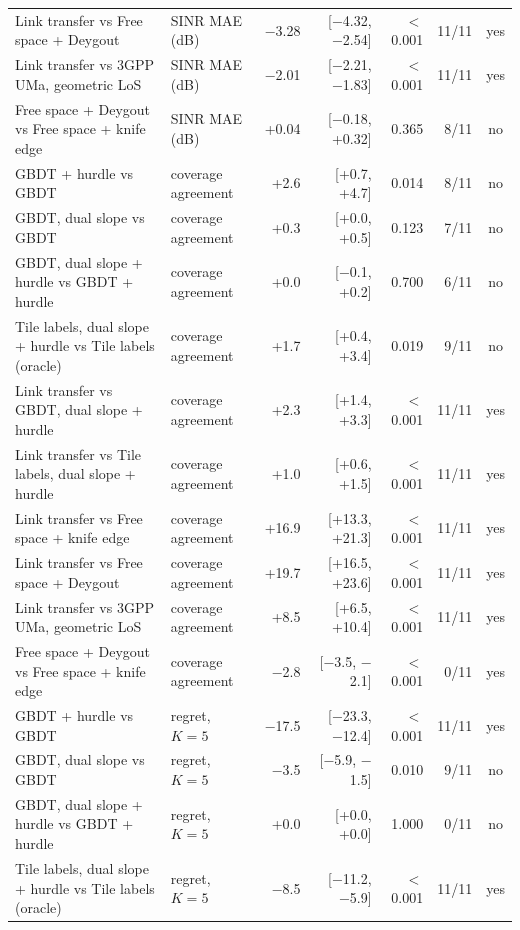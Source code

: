 \begin{tabular}{llrrrrc}
Link transfer vs Free space + Deygout & SINR MAE (dB) & \ensuremath{-}3.28 & [\ensuremath{-}4.32, \ensuremath{-}2.54] & $<$0.001 & 11/11 & yes \\
Link transfer vs 3GPP UMa, geometric LoS & SINR MAE (dB) & \ensuremath{-}2.01 & [\ensuremath{-}2.21, \ensuremath{-}1.83] & $<$0.001 & 11/11 & yes \\
Free space + Deygout vs Free space + knife edge & SINR MAE (dB) & +0.04 & [\ensuremath{-}0.18, +0.32] & 0.365 & 8/11 & no \\
GBDT + hurdle vs GBDT & coverage agreement & +2.6 & [+0.7, +4.7] & 0.014 & 8/11 & no \\
GBDT, dual slope vs GBDT & coverage agreement & +0.3 & [+0.0, +0.5] & 0.123 & 7/11 & no \\
GBDT, dual slope + hurdle vs GBDT + hurdle & coverage agreement & +0.0 & [\ensuremath{-}0.1, +0.2] & 0.700 & 6/11 & no \\
Tile labels, dual slope + hurdle vs Tile labels (oracle) & coverage agreement & +1.7 & [+0.4, +3.4] & 0.019 & 9/11 & no \\
Link transfer vs GBDT, dual slope + hurdle & coverage agreement & +2.3 & [+1.4, +3.3] & $<$0.001 & 11/11 & yes \\
Link transfer vs Tile labels, dual slope + hurdle & coverage agreement & +1.0 & [+0.6, +1.5] & $<$0.001 & 11/11 & yes \\
Link transfer vs Free space + knife edge & coverage agreement & +16.9 & [+13.3, +21.3] & $<$0.001 & 11/11 & yes \\
Link transfer vs Free space + Deygout & coverage agreement & +19.7 & [+16.5, +23.6] & $<$0.001 & 11/11 & yes \\
Link transfer vs 3GPP UMa, geometric LoS & coverage agreement & +8.5 & [+6.5, +10.4] & $<$0.001 & 11/11 & yes \\
Free space + Deygout vs Free space + knife edge & coverage agreement & \ensuremath{-}2.8 & [\ensuremath{-}3.5, \ensuremath{-}2.1] & $<$0.001 & 0/11 & yes \\
GBDT + hurdle vs GBDT & regret, $K{=}5$ & \ensuremath{-}17.5 & [\ensuremath{-}23.3, \ensuremath{-}12.4] & $<$0.001 & 11/11 & yes \\
GBDT, dual slope vs GBDT & regret, $K{=}5$ & \ensuremath{-}3.5 & [\ensuremath{-}5.9, \ensuremath{-}1.5] & 0.010 & 9/11 & no \\
GBDT, dual slope + hurdle vs GBDT + hurdle & regret, $K{=}5$ & +0.0 & [+0.0, +0.0] & 1.000 & 0/11 & no \\
Tile labels, dual slope + hurdle vs Tile labels (oracle) & regret, $K{=}5$ & \ensuremath{-}8.5 & [\ensuremath{-}11.2, \ensuremath{-}5.9] & $<$0.001 & 11/11 & yes \\

\end{tabular}
